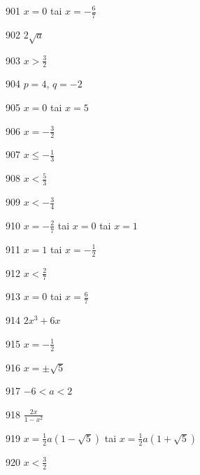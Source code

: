 \begin{Vastaus}{901}
$x=0$ tai $x=-\frac{6}{7}$
\end{Vastaus}
\begin{Vastaus}{902}
$2\sqrt{a}$
\end{Vastaus}
\begin{Vastaus}{903}
$x>\frac{3}{2}$
\end{Vastaus}
\begin{Vastaus}{904}
$p=4$, $q=-2$
\end{Vastaus}
\begin{Vastaus}{905}
$x=0$ tai $x=5$
\end{Vastaus}
\begin{Vastaus}{906}
$x=-\frac{3}{2}$
\end{Vastaus}
\begin{Vastaus}{907}
$x \leq -\frac{1}{3}$
\end{Vastaus}
\begin{Vastaus}{908}
$x<\frac{5}{3}$
\end{Vastaus}
\begin{Vastaus}{909}
$x<-\frac{3}{4}$
\end{Vastaus}
\begin{Vastaus}{910}
$x=-\frac{2}{7}$ tai $x=0$ tai $x=1$
\end{Vastaus}
\begin{Vastaus}{911}
$x=1$ tai $x=-\frac{1}{2}$
\end{Vastaus}
\begin{Vastaus}{912}
$x< \frac{2}{7} $
\end{Vastaus}
\begin{Vastaus}{913}
$x=0$ tai $x=\frac{6}{7}$
\end{Vastaus}
\begin{Vastaus}{914}
$2x^3+6x$
\end{Vastaus}
\begin{Vastaus}{915}
$x=-\frac{1}{2}$
\end{Vastaus}
\begin{Vastaus}{916}
$x=\pm \sqrt{5}$
\end{Vastaus}
\begin{Vastaus}{917}
$-6<a<2$
\end{Vastaus}
\begin{Vastaus}{918}
$\frac{2x}{1-x^2}$
\end{Vastaus}
\begin{Vastaus}{919}
$x= \frac{1}{2}a(1-\sqrt{5})$ tai $x= \frac{1}{2}a(1+\sqrt{5})$
\end{Vastaus}
\begin{Vastaus}{920}
$x<\frac{3}{2}$
\end{Vastaus}

